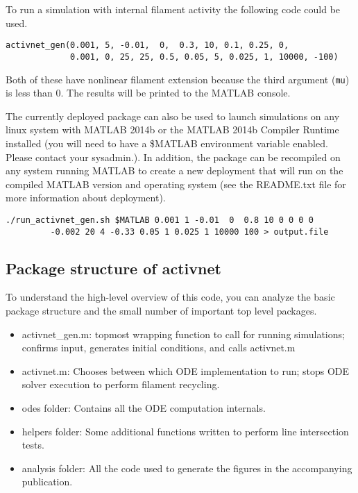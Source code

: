 To run a simulation with internal filament activity the following code could be used.

\begin{verbatim}
activnet_gen(0.001, 5, -0.01,  0,  0.3, 10, 0.1, 0.25, 0, 
             0.001, 0, 25, 25, 0.5, 0.05, 5, 0.025, 1, 10000, -100)
\end{verbatim}

Both of these have nonlinear filament extension because the third argument (\texttt{mu}) is less than 0.  The results will be printed to the MATLAB console.

The currently deployed package can also be used to launch simulations on any linux system with MATLAB 2014b or the MATLAB 2014b Compiler Runtime installed (you will need to have a \$MATLAB environment variable enabled.  Please contact your sysadmin.).  In addition, the package can be recompiled on any system running MATLAB to create a new deployment that will run on the compiled MATLAB version and operating system (see the README.txt file for more information about deployment).  

\begin{verbatim}
./run_activnet_gen.sh $MATLAB 0.001 1 -0.01  0  0.8 10 0 0 0 0 
         -0.002 20 4 -0.33 0.05 1 0.025 1 10000 100 > output.file
\end{verbatim}




\subsection{Package structure of activnet}

To understand the high-level overview of this code, you can analyze the basic package structure and the small number of important top level packages.

\begin{itemize}
	\item  activnet\_gen.m: topmost wrapping function to call for running simulations; confirms input, generates initial conditions, and calls activnet.m 
	\item  activnet.m: Chooses between which ODE implementation to run; stops ODE solver execution to perform filament recycling.
	\item odes folder: Contains all the ODE computation internals.
	\item helpers folder: Some additional functions written to perform line intersection tests.
	\item analysis folder: All the code used to generate the figures in the accompanying publication.
\end{itemize}


